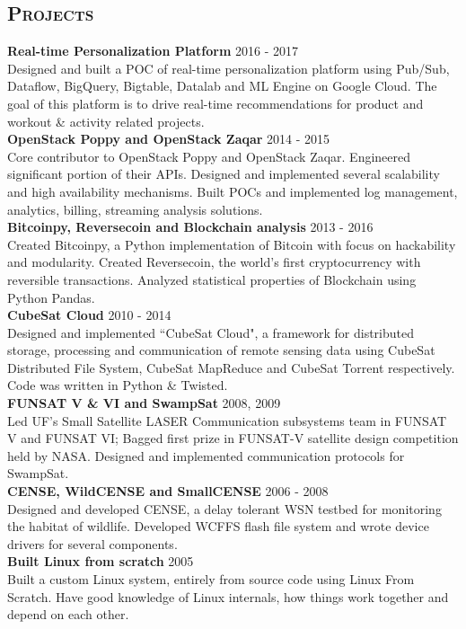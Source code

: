 \begin{resume}
\section{\textsc{Projects}}
\textbf{Real-time Personalization Platform} \hfill 2016 - 2017\\
Designed and built a POC of real-time personalization platform using Pub/Sub, Dataflow, BigQuery, Bigtable, Datalab and ML Engine on Google Cloud. The goal of this platform is to drive real-time recommendations for product and workout \& activity related projects.\\
\textbf{OpenStack Poppy and OpenStack Zaqar} \hfill 2014 - 2015\\
Core contributor to OpenStack Poppy and OpenStack Zaqar. Engineered significant portion of their APIs. Designed and implemented several scalability and high availability mechanisms. Built POCs and implemented log management, analytics, billing, streaming analysis solutions.\\
\textbf{Bitcoinpy, Reversecoin and Blockchain analysis} \hfill 2013 - 2016\\
Created Bitcoinpy, a Python implementation of Bitcoin with focus on hackability and modularity. Created Reversecoin, the world's first cryptocurrency with reversible transactions. Analyzed statistical properties of Blockchain using Python Pandas.\\
\textbf{CubeSat Cloud} \hfill 2010 - 2014 \\
Designed and implemented ``CubeSat Cloud", a framework for distributed storage, processing and communication of remote sensing data using CubeSat Distributed File System, CubeSat MapReduce and CubeSat Torrent respectively. Code was written in Python \& Twisted.\\
\textbf{FUNSAT V \& VI and SwampSat} \hfill 2008, 2009 \\
Led UF's Small Satellite LASER Communication subsystems team in FUNSAT V and FUNSAT VI; Bagged first prize in FUNSAT-V satellite design competition held by NASA. Designed and implemented communication protocols for SwampSat.\\
\textbf{CENSE, WildCENSE and SmallCENSE} \hfill 2006 - 2008\\
Designed and developed CENSE, a delay tolerant WSN testbed for monitoring the habitat of wildlife. Developed WCFFS flash file system and wrote device drivers for several components.\\
\textbf{Built Linux from scratch} \hfill 2005 \\
Built a custom Linux system, entirely from source code using Linux From Scratch. Have good knowledge of Linux internals, how things work together and depend on each other.


\end{resume}
